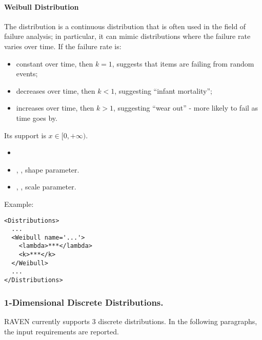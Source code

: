 \paragraph{Weibull Distribution}
\label{Weibull}
The  distribution is a continuous distribution that is often
used in the field of failure analysis; in particular, it can mimic distributions
where the failure rate varies over time.
%
If the failure rate is:
\vspace{-5mm}
\begin{itemize}
\itemsep0em
\item constant over time, then $k = 1$, suggests that items are failing from
  random events;
\item decreases over time, then $k < 1$, suggesting ``infant mortality''; 
\item increases over time, then $k > 1$, suggesting ``wear out'' - more likely
  to fail as time goes by.
\end{itemize}
\vspace{-5mm}
 Its support is $x \in [0, +\infty)$.

%
\attrIntro
\vspace{-5mm}
\begin{itemize}
\itemsep0em
\item \nameDescription  
\end{itemize}
\vspace{-5mm}
\subnodesIntro
\begin{itemize}
\item {}, , shape parameter.
\item {}, , scale parameter.
\end{itemize}

Example:
\begin{lstlisting}[style=XML]
<Distributions>
  ...
  <Weibull name='...'>
    <lambda>***</lambda>
    <k>***</k>
  </Weibull>
  ...
</Distributions>
\end{lstlisting}

\subsubsection{1-Dimensional Discrete Distributions.}
\label{subsubsec:1DDiscrete}
RAVEN currently supports 3 discrete distributions.
%
In the following paragraphs, the input requirements are reported.

